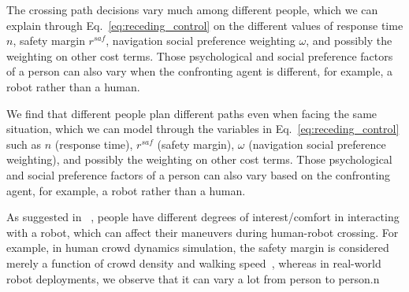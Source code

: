 \documentclass[conference]{IEEEtran}
\begin{document}



The crossing path decisions vary much among different people, which we can 
explain through Eq.~\ref{eq:receding_control} on the different values of response 
time $n$, safety margin $r^{saf}$, navigation social preference weighting 
$\omega$, and possibly the weighting on other cost terms. Those psychological 
and social preference factors of a person can also vary when the confronting 
agent is different, for example, a robot rather than a human.

We find that different people plan different paths even when facing the same situation, which we can 
model through the variables in Eq.~\ref{eq:receding_control} such as 
$n$ (response time), $r^{saf}$ (safety margin), $\omega$ (navigation social preference weighting), and possibly the weighting on other cost terms. Those psychological 
and social preference factors of a person can also vary based on the confronting
agent, for example, a robot rather than a human.

As suggested in ~\cite{hansen2009adaptive},
people have different degrees of interest/comfort in interacting with a robot, which 
can affect their maneuvers during human-robot crossing. For 
example, in human crowd dynamics simulation, the safety margin is considered 
merely a function of crowd density and walking speed~\cite{helbing1995social},
whereas in real-world robot deployments, we observe that it can vary a lot from person to person.n
\end{document}

